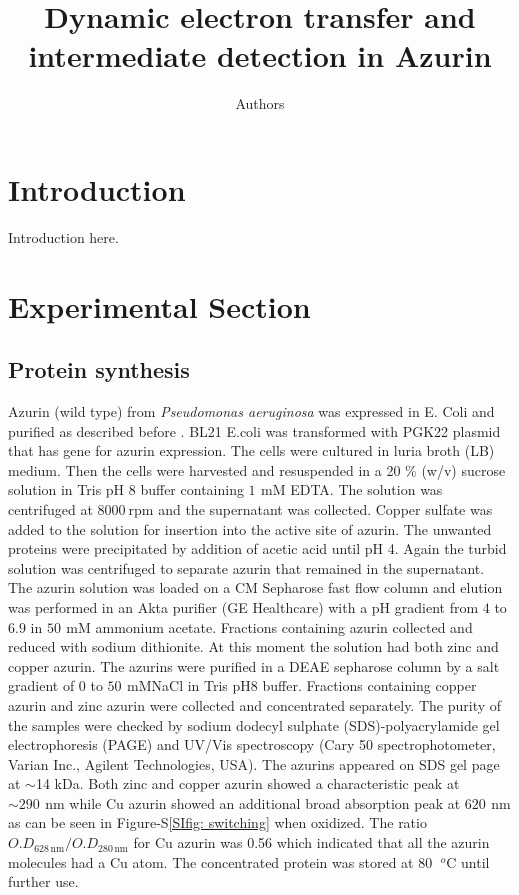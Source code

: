 \documentclass[journal=jacsat,manuscript=article]{achemso}
\author{Authors}
\affiliation{Huygens-Kamerlingh Onnes Laboratory, Leiden University, RA, Leiden, The Netherlands}
\title[]
{Dynamic electron transfer and intermediate detection in Azurin}
\newcommand{\nm}{\ensuremath{\,\textrm{nm}}}
\newcommand{\mM}{\ensuremath{\,\textrm{mM}}}
\newcommand{\degree}{\ensuremath{\,~^o\textrm{C}}}
\begin{document}
\section{Introduction}
Introduction here.
\section{Experimental Section}
\subsection{Protein synthesis}
Azurin (wild type) from \textit{Pseudomonas aeruginosa} was expressed in E. Coli and purified as described before \citep{kamp1990purification}. BL21 E.coli was transformed with PGK22 plasmid that has gene for azurin expression. The cells were cultured in luria broth (LB) medium. Then the cells were harvested and resuspended in a 20 \% (w/v) sucrose solution in Tris pH 8 buffer containing $1~\mM$ EDTA. The solution was centrifuged at $8000~$rpm and the supernatant was collected. Copper sulfate was added to the solution for insertion into the active site of azurin. The unwanted proteins were precipitated by addition of acetic acid until pH 4. Again the turbid solution was centrifuged to separate azurin that remained in the supernatant. The azurin solution was loaded on a CM Sepharose fast flow column and elution was performed in an Akta purifier (GE Healthcare) with a pH gradient from $4$ to $6.9$ in $50~\mM$ ammonium acetate. Fractions containing azurin collected and reduced with sodium dithionite. At this moment the solution had both zinc and copper azurin. The azurins were purified in a DEAE sepharose column by a salt gradient of 0 to $50~$\mM NaCl in Tris pH8 buffer. Fractions containing copper azurin and zinc azurin were collected and concentrated separately. The purity of the samples were checked by sodium dodecyl sulphate (SDS)-polyacrylamide gel electrophoresis (PAGE) and UV/Vis spectroscopy (Cary 50 spectrophotometer, Varian Inc., Agilent Technologies, USA). The azurins appeared on SDS gel page at $\sim$14 kDa. Both zinc and copper azurin showed a characteristic peak at ${\sim}290~\nm$ while Cu azurin showed an additional broad absorption peak at $620~\nm$ as can be seen in Figure-S\ref{SIfig: switching} when oxidized. The ratio $O.D_{628\nm}/O.D_{280\nm}$ for Cu azurin was 0.56 which indicated that all the azurin molecules had a Cu atom. The concentrated protein was stored at $80~\degree$ until further use.
\end{document}
